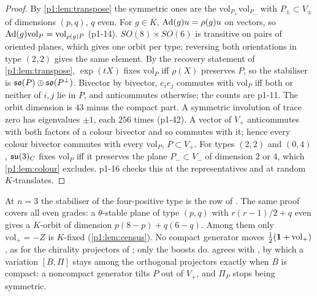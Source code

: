 \begin{proof}
By \cref{p1:lem:transpose} the symmetric ones are the $\mathrm{vol}_{P_+}\mathrm{vol}_{P_-}$ with $P_\pm\subset V_\pm$ of dimensions $(p,q)$, $q$ even. For $g\in K$,
$\operatorname{Ad}(g)u=\rho(g)u$ on vectors, so $\operatorname{Ad}(g)\mathrm{vol}_P=\mathrm{vol}_{\rho(g)P}$ (p1-14). $SO(8)\times SO(6)$ is transitive on pairs of oriented planes, which gives one orbit per
type; reversing both orientations in type $(2,2)$ gives the same element. By the recovery statement of \cref{p1:lem:transpose}, $\exp(tX)$ fixes $\mathrm{vol}_P$ iff $\rho(X)$
preserves $P$, so the stabiliser is $\mathfrak{so}(P)\oplus\mathfrak{so}(P^\perp)$. Bivector by bivector, $e_ie_j$ commutes with $\mathrm{vol}_P$ iff both or neither of $i,j$ lie in $P$, and
anticommutes otherwise; the counts are p1-11. The orbit dimension is $43$ minus the compact part. A symmetric involution of trace zero has eigenvalues $\pm1$, each $256$
times (p1-42). A vector of $V_+$ anticommutes with both factors of a colour bivector and so commutes with it; hence every colour bivector commutes with every $\mathrm{vol}_P$, $P\subset V_+$. For types $(2,2)$ and $(0,4)$,
$\mathfrak{su}(3)_C$ fixes $\mathrm{vol}_P$ iff it preserves the plane $P_-\subset V_-$ of dimension $2$ or $4$, which \cref{p1:lem:colour} excludes. p1-16 checks this at the
representatives and at random $K$-translates.
\end{proof}

At $n=3$ the stabiliser of the four-positive type is the row of \cite[Prop.~26.9]{ES17}. The same proof covers all even grades: a $\theta$-stable plane of type $(p,q)$
with $r(r-1)/2+q$ even gives a $K$-orbit of dimension $p(8-p)+q(6-q)$. Among them only $\mathrm{vol}_+=-Z$ is $K$-fixed (\cref{p1:lem:census}). No compact generator moves
$\tfrac12(\mathbf 1+\mathrm{vol}_+)$, as for the chirality projectors of \cite[Prop.~26.4]{ES17}; only the boosts do.  agrees with \cite[Thm.~11.3]{ES17}, by which a
variation $[B,\Pi]$ stays among the orthogonal projectors exactly when $B$ is compact: a noncompact generator tilts $P$ out of $V_+$, and $\Pi_P$ stops being symmetric.

